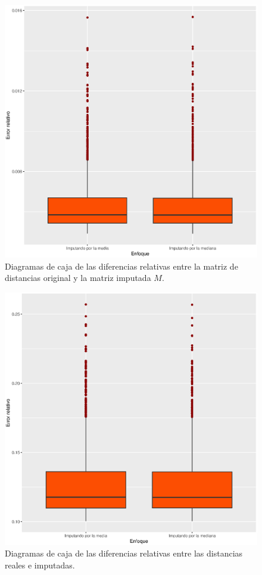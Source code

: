 \documentclass[12pt]{report} %
\theoremstyle{definition}
\begin{document}
{\begin{figure}[H]
	\centering
	\includegraphics[scale=0.5]{imagenes/tf_imputation_mean_and_median_dif_relativa.eps}
	\caption{Diagramas de caja de las diferencias relativas entre la matriz de distancias original y la matriz imputada $M$.}
	\label{fig:MD1}
\end{figure}

\begin{figure}[H]
	\centering
	\includegraphics[scale=0.5]{imagenes/tf_imputation_mean_and_median_errores.eps}
	\caption{Diagramas de caja de las diferencias relativas entre las distancias reales e imputadas.}
	\label{fig:MD2}
\end{figure}

}
\end{document}
